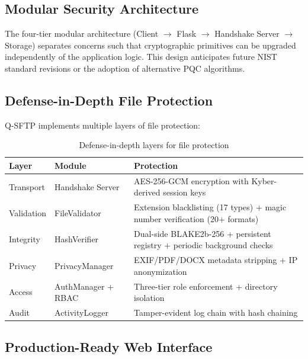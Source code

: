\subsection{Modular Security Architecture}

The four-tier modular architecture (Client $\rightarrow$ Flask $\rightarrow$ Handshake Server $\rightarrow$ Storage) separates concerns such that cryptographic primitives can be upgraded independently of the application logic. This design anticipates future NIST standard revisions or the adoption of alternative PQC algorithms.

\subsection{Defense-in-Depth File Protection}

Q-SFTP implements multiple layers of file protection:

\begin{table}[H]
    \centering
    \caption{Defense-in-depth layers for file protection}
    \label{tab:defense}
    \begin{tabular}{|l|l|p{7cm}|}
        \hline
        \textbf{Layer} & \textbf{Module} & \textbf{Protection} \\
        \hline
        Transport & Handshake Server & AES-256-GCM encryption with Kyber-derived session keys \\
        \hline
        Validation & FileValidator & Extension blacklisting (17 types) + magic number verification (20+ formats) \\
        \hline
        Integrity & HashVerifier & Dual-side BLAKE2b-256 + persistent registry + periodic background checks \\
        \hline
        Privacy & PrivacyManager & EXIF/PDF/DOCX metadata stripping + IP anonymization \\
        \hline
        Access & AuthManager + RBAC & Three-tier role enforcement + directory isolation \\
        \hline
        Audit & ActivityLogger & Tamper-evident log chain with hash chaining \\
        \hline
    \end{tabular}
\end{table}

\subsection{Production-Ready Web Interface}

